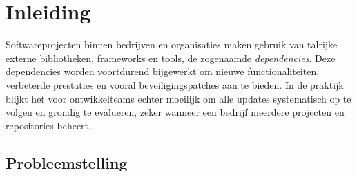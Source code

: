 


% 

\section{Inleiding}
\label{sec:inleiding}

Softwareprojecten binnen bedrijven en organisaties maken gebruik van talrijke externe bibliotheken, frameworks en tools, de zogenaamde \emph{dependencies}. Deze dependencies worden voortdurend bijgewerkt om nieuwe functionaliteiten, verbeterde prestaties en vooral beveiligingspatches aan te bieden.\parencite{Pashchenko2018} In de praktijk blijkt het voor ontwikkelteams echter moeilijk om alle updates systematisch op te volgen en grondig te evalueren, zeker wanneer een bedrijf meerdere projecten en repositories beheert.

\subsection{Probleemstelling}
\label{sec:Probleemstelling}

